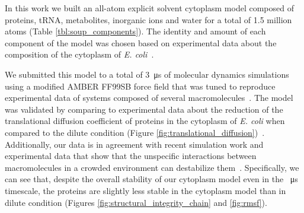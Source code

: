 \documentclass[journal=jcisd8,manuscript=article]{achemso}
\begin{document}
In this work we built an all-atom explicit solvent cytoplasm model
composed of proteins, tRNA, metabolites, inorganic ions and water for a total
of 1.5 million atoms (Table \ref{tbl:soup_components}). The identity
and amount of each component of the model was chosen based on
experimental data about the composition of the cytoplasm of
\textit{E. coli}~\cite{Dong1996,Bennett2009,Link1997,Mcguffee2010}.

We submitted this model to a total of \SI{3}{\micro\second} of
molecular dynamics simulations using a modified AMBER FF99SB force
field that was tuned to reproduce experimental data of systems
composed of several macromolecules~\cite{Best2014a}. The model was
validated by comparing to experimental data about the reduction of the
translational diffusion coefficient of proteins in the cytoplasm of
\textit{E. coli} when compared to the dilute condition (Figure
\ref{fig:translational_diffusion})~\cite{Elowitz1999,Konopka2006}. Additionally,
our data is in agreement with recent simulation work and experimental data
that show that the unspecific interactions between macromolecules in a
crowded environment can destabilize
them~\cite{Feig2011,miklos2011,Wang2012b}. Specifically, we can see
that, despite the overall stability of our cytoplasm model even in the
\SI{}{\micro\second} timescale, the proteins are slightly less stable
in the cytoplasm model than in dilute condition (Figures
\ref{fig:structural_integrity_chain} and \ref{fig:rmsf}).


\end{document}
